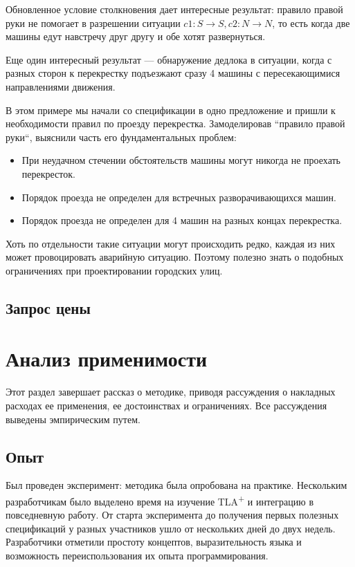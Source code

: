 \documentclass[14pt, openany]{book}
\newcommand{\tlapl}{TLA\textsuperscript{+} }
\begin{document}
Обновленное условие столкновения дает интересные результат: правило правой руки не помогает в разрешении ситуации \(c1: S \rightarrow S, c2: N \rightarrow N \), то есть когда две машины едут навстречу друг другу и обе хотят развернуться. 


Еще один интересный результат --- обнаружение дедлока в ситуации, когда с разных сторон к перекрестку подъезжают сразу 4 машины с пересекающимися направлениями движения.

В этом примере мы начали со спецификации в одно предложение и пришли к необходимости правил по проезду перекрестка. Замоделировав ``правило правой руки``, выяснили часть его фундаментальных проблем:
\begin{itemize}
  \item При неудачном стечении обстоятельств машины могут никогда не проехать перекресток.
  \item Порядок проезда не определен для встречных разворачивающихся машин. 
  \item Порядок проезда не определен для 4 машин на разных концах перекрестка.
\end{itemize}

Хоть по отдельности такие ситуации могут происходить редко, каждая из них может провоцировать аварийную ситуацию. Поэтому полезно знать о подобных ограничениях при проектировании городских улиц.

\subsection{Запрос цены}

\section{Анализ применимости}
Этот раздел завершает рассказ о методике, приводя рассуждения о накладных расходах ее применения, ее достоинствах и ограничениях.
Все рассуждения выведены эмпирическим путем.

\subsection{Опыт}
Был проведен эксперимент: методика была опробована на практике. Нескольким разработчикам было выделено время на изучение \tlapl и интеграцию в повседневную работу. От старта эксперимента до получения первых полезных спецификаций у разных участников ушло от нескольких дней до двух недель. Разработчики отметили простоту концептов, выразительность языка и возможность переиспользования их опыта программирования. 
\end{document}
